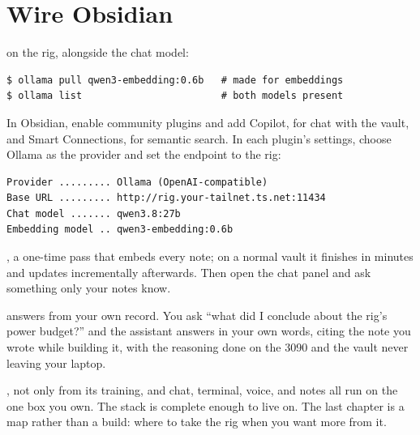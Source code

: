 \section{Wire Obsidian}

 on the rig, alongside the chat model:

\begin{verbatim}
$ ollama pull qwen3-embedding:0.6b   # made for embeddings
$ ollama list                        # both models present
\end{verbatim}


 In Obsidian, enable community plugins and add
Copilot, for chat with the vault, and Smart Connections, for semantic search. In each
plugin's settings, choose Ollama as the provider and set the endpoint to the rig:

\begin{verbatim}
Provider ......... Ollama (OpenAI-compatible)
Base URL ......... http://rig.your-tailnet.ts.net:11434
Chat model ....... qwen3.8:27b
Embedding model .. qwen3-embedding:0.6b
\end{verbatim}


, a one-time pass that embeds every note; on a normal
vault it finishes in minutes and updates incrementally afterwards. Then open the chat
panel and ask something only your notes know.

 answers from your own record. You ask ``what did I
conclude about the rig's power budget?'' and the assistant answers in your own
words, citing the note you wrote while building it, with the reasoning done on the
3090 and the vault never leaving your laptop.


, not only from its
training, and chat, terminal, voice, and notes all run on the one box you own. The
stack is complete enough to live on. The last chapter is a map rather than a build:
where to take the rig when you want more from it.

